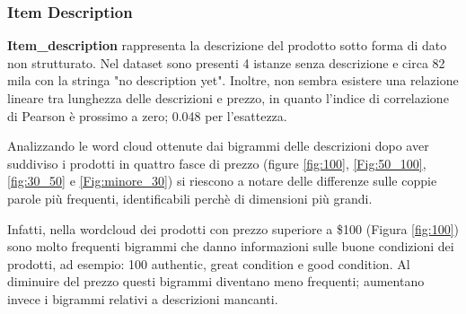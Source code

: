\subsubsection{Item Description}
\textbf{Item\_description} rappresenta la descrizione del prodotto sotto forma
di dato non strutturato. Nel dataset sono presenti 4 istanze senza descrizione e
circa 82 mila con la stringa "no description yet".
Inoltre, non sembra esistere una relazione lineare tra lunghezza delle
descrizioni e prezzo, in quanto l'indice di correlazione di Pearson è prossimo a
zero; 0.048 per l'esattezza.

Analizzando le word cloud ottenute dai bigrammi delle descrizioni dopo aver
suddiviso i prodotti in quattro fasce di prezzo (figure \ref{fig:100},
\ref{Fig:50_100}, \ref{fig:30_50} e \ref{Fig:minore_30}) si riescono a notare delle differenze sulle coppie parole più frequenti, identificabili perchè
di dimensioni più grandi.

Infatti, nella wordcloud dei prodotti con prezzo superiore a \$100 (Figura
\ref{fig:100}) sono molto frequenti bigrammi che danno informazioni sulle buone
condizioni dei prodotti, ad esempio:  100 authentic, great condition e good
condition. Al diminuire del prezzo questi bigrammi diventano meno frequenti;
aumentano invece i bigrammi relativi a descrizioni mancanti.

